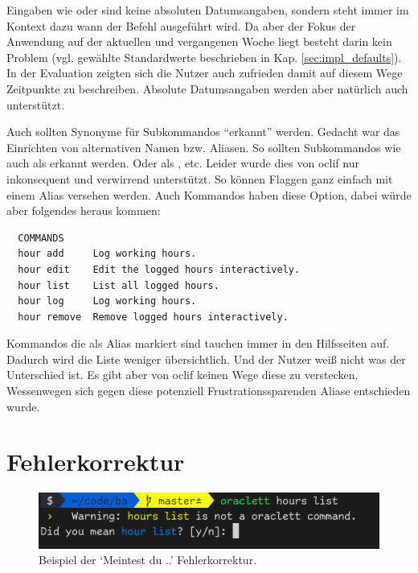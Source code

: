 \documentclass[oneside,bibliography=totocnumbered,BCOR=5mm]{scrbook}
\newenvironment{code}{\captionsetup{type=listing, skip=0pt}}{}
\begin{document}
Eingaben wie  oder  sind
keine absoluten Datumsangaben, sondern steht immer im Kontext dazu wann der
Befehl ausgeführt wird. Da aber der Fokus der Anwendung auf der aktuellen und
vergangenen Woche liegt besteht darin kein Problem (vgl. gewählte Standardwerte
beschrieben in Kap. \ref{sec:impl_defaults}). In der Evaluation zeigten sich die
Nutzer auch zufrieden damit auf diesem Wege Zeitpunkte zu beschreiben. Absolute
Datumsangaben werden aber natürlich auch unterstützt.

Auch sollten Synonyme für Subkommandos ``erkannt'' werden. Gedacht war das
Einrichten von alternativen Namen bzw. Aliasen. So sollten Subkommandos
wie  auch als  erkannt werden. Oder
 als , etc. Leider wurde dies von oclif
nur inkonsequent und verwirrend unterstützt. So können Flaggen ganz einfach mit
einem Alias versehen werden. Auch Kommandos haben diese Option, dabei würde aber
folgendes heraus kommen:

\begin{code}
  \medskip
  \begin{verbatim}
  COMMANDS
  hour add     Log working hours.
  hour edit    Edit the logged hours interactively.
  hour list    List all logged hours.
  hour log     Log working hours.
  hour remove  Remove logged hours interactively.
  \end{verbatim}
\end{code}

Kommandos die als Alias markiert sind tauchen immer in den Hilfsseiten auf.
Dadurch wird die Liste weniger übersichtlich. Und der Nutzer weiß nicht was
der Unterschied ist. Es gibt aber von oclif keinen Wege diese zu verstecken.
Wessenwegen sich gegen diese potenziell Frustrationssparenden Aliase entschieden
wurde.

\section{Fehlerkorrektur}

\begin{figure}
  \centering
  \includegraphics[scale=0.5]{did-you-mean.png}
  \caption{Beispiel der `Meintest du ..' Fehlerkorrektur.}
  \label{fig:did-you-mean}
\end{figure}
\end{document}
